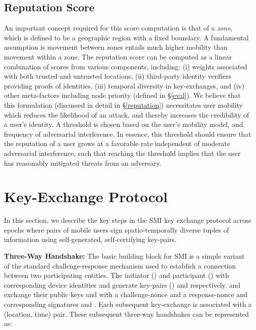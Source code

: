 \documentclass[letterpaper,twocolumn]{sig-alternate}
\begin{document}
\subsection{Reputation Score}
\label{score}

An important concept required for this score computation is that of a {\em zone}, which is defined to be a geographic region with a fixed boundary. A fundamental assumption is movement between zones entails much higher mobility than movement within a zone. The reputation score can be computed as a linear combination of scores from various components, including: (i) weights associated with both trusted and untrusted locations, (ii) third-party identity verifiers providing proofs of identities, (iii) temporal diversity in key-exchanges, and (iv) other meta-factors including node priority (defined in \S \ref{eval}). We believe that this formulation (discussed in detail in \S \ref{reputation}) necessitates user mobility which reduces the likelihood of an attack, and thereby increases the credibility of a user's identity. A threshold is chosen based on the user's mobility model, and frequency of adversarial interference. In essence, this threshold should ensure that the reputation of a user grows at a favorable rate independent of moderate adversarial interference, such that reaching the threshold implies that the user has reasonably mitigated threats from an adversary. \section{Key-Exchange Protocol}
\label{scp}

In this section, we describe the key steps in the SMI key exchange protocol across epochs where pairs of mobile users sign spatio-temporally diverse tuples of information using self-generated, self-certifying key-pairs.

\vspace{1mm}
{\bf Three-Way Handshake:} The basic building block for SMI is a simple variant of the standard challenge-response mechanism used to establish a connection between two participating entities.  The initiator () and participant () with corresponding device identities  and  generate key-pairs () and  respectively.  and  exchange their public keys  and  with a challenge-nonce  and a response-nonce  and corresponding signatures  and . Each subsequent key-exchange is associated with a (location, time) pair. These subsequent three-way handshakes can be represented as:
\vspace{-2mm}
\end{document}
